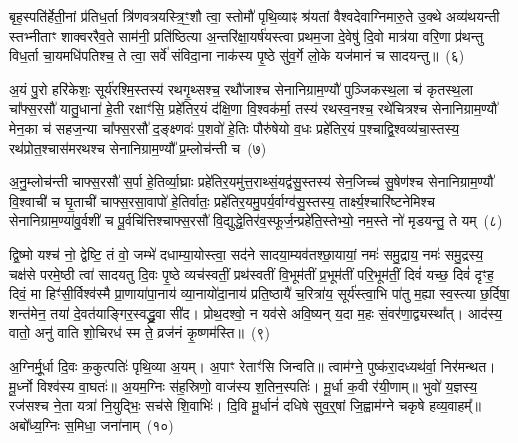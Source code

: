 बृह॒स्पति॑र्\mbox{}हेती॒नां प्र॑तिध॒र्ता त्रि॑णवत्रयस्त्रि॒ꣳ॒शौ त्वा॒ स्तोमौ॑ पृथि॒व्याꣴ श्र॑यतां वैश्वदेवाग्निमारु॒ते उ॒क्थे अव्य॑थयन्ती स्तभ्नीताꣳ शाक्वररैव॒ते साम॑नी॒ प्रति॑ष्ठित्या अ॒न्तरि॑क्षा॒यर्\mbox{}ष॑यस्त्वा प्रथम॒जा दे॒वेषु॑ दि॒वो मात्र॑या वरि॒णा प्र॑थन्तु विध॒र्ता चा॒यमधि॑पतिश्च॒ ते त्वा॒ सर्वे॑ संविदा॒ना नाक॑स्य पृ॒ष्ठे सु॑व॒र्गे लो॒के यज॑मानं च सादयन्तु॥~(६)

{\anuvakamend[{प्र॒तीची॒ दिङ्म॒रुत॑स्ते दे॒वा अधि॑पतयश्चत्वारि॒ꣳ॒शच्च॑}]}%

अ॒यं पु॒रो हरि॑केशः॒ सूर्य॑रश्मि॒स्तस्य॑ रथगृ॒थ्सश्च॒ रथौ॑जाश्च सेनानिग्राम॒ण्यौ॑ पुञ्जिकस्थ॒ला च॑ कृतस्थ॒ला चा᳚फ्स॒रसौ॑ यातु॒धाना॑ हे॒ती रक्षाꣳ॑सि॒ प्रहे॑तिर॒यं द॑क्षि॒णा वि॒श्वक॑र्मा॒ तस्य॑ रथस्व॒नश्च॒ रथे॑चित्रश्च सेनानिग्राम॒ण्यौ॑ मेन॒का च॑ सहज॒न्या चा᳚फ्स॒रसौ॑ द॒ङ्क्ष्णवः॑ प॒शवो॑ हे॒तिः पौरु॑षेयो व॒धः प्रहे॑तिर॒यं प॒श्चाद्वि॒श्वव्य॑चा॒स्तस्य॒ रथ॑प्रोत॒श्चास॑मरथश्च सेनानिग्राम॒ण्यौ᳚ प्र॒म्लोच॑न्ती च~(७)

अ॒नु॒म्लोच॑न्ती चाफ्स॒रसौ॑ स॒र्पा हे॒तिर्व्या॒घ्राः प्रहे॑तिर॒यमु॑त्त॒राथ्सं॒यद्व॑सु॒स्तस्य॑ सेन॒जिच्च॑ सु॒षेण॑श्च सेनानिग्राम॒ण्यौ॑ वि॒श्वाची॑ च घृ॒ताची॑ चाफ्स॒रसा॒वापो॑ हे॒तिर्वातः॒ प्रहे॑तिर॒यमु॒पर्य॒र्वाग्व॑सु॒स्तस्य॒ तार्क्ष्य॒श्चारि॑ष्टनेमिश्च सेनानिग्राम॒ण्या॑\-वु॒र्वशी॑ च पू॒र्वचि॑त्तिश्चाफ्स॒रसौ॑ वि॒द्युद्धे॒तिर॑व॒स्फूर्ज॒न्प्रहे॑ति॒स्तेभ्यो॒ नम॒स्ते नो॑ मृडयन्तु॒ ते यम्~(८)

द्वि॒ष्मो यश्च॑ नो॒ द्वेष्टि॒ तं वो॒ जम्भे॑ दधाम्या॒योस्त्वा॒ सद॑ने सादया॒म्यव॑तश्छा॒यायां॒ नमः॑ समु॒द्राय॒ नमः॑ समु॒द्रस्य॒ चक्ष॑से परमे॒ष्ठी त्वा॑ सादयतु दि॒वः पृ॒ष्ठे व्यच॑स्वतीं॒ प्रथ॑स्वतीं वि॒भूम॑तीं प्र॒भूम॑तीं परि॒भूम॑तीं॒ दिवं॑ यच्छ॒ दिवं॑ दृꣳह॒ दिवं॒ मा हिꣳ॑सी॒र्विश्व॑स्मै प्रा॒णाया॑पा॒नाय॑ व्या॒नायो॑दा॒नाय॑ प्रति॒ष्ठायै॑ च॒रित्रा॑य॒ सूर्य॑स्त्वा॒भि पा॑तु म॒ह्या स्व॒स्त्या छ॒र्दिषा॒ शन्त॑मेन॒ तया॑ दे॒वत॑याङ्गिर॒स्वद्ध्रु॒वा सी॑द। प्रोथ॒दश्वो॒ न यव॑से अवि॒ष्यन् य॒दा म॒हः सं॒वर॑णा॒द्व्यस्था᳚त्। आद॑स्य॒ वातो॒ अनु॑ वाति शो॒चिरध॑ स्म ते॒ व्रज॑नं कृ॒ष्णम॑स्ति॥~(९)

{\anuvakamend[{प्र॒म्लोच॑न्ती च॒ यꣴ स्व॒स्त्याष्टाविꣳ॑शतिश्च}]}%

अ॒ग्निर्मू॒र्धा दि॒वः क॒कुत्पतिः॑ पृथि॒व्या अ॒यम्। अ॒पाꣳ रेताꣳ॑सि जिन्वति॥ त्वाम॑ग्ने॒ पुष्क॑रा॒दध्यथ॑र्वा॒ निर॑मन्थत। मू॒र्ध्नो विश्व॑स्य वा॒घतः॑॥ अ॒यम॒ग्निः स॑ह॒स्रिणो॒ वाज॑स्य श॒तिन॒स्पतिः॑। मू॒र्धा क॒वी र॑यी॒णाम्॥ भुवो॑ य॒ज्ञस्य॒ रज॑सश्च ने॒ता यत्रा॑ नि॒युद्भिः॒ सच॑से शि॒वाभिः॑। दि॒वि मू॒र्धानं॑ दधिषे सुव॒र्॒\mbox{}षां जि॒ह्वाम॑ग्ने चकृषे हव्य॒वाहम्᳚॥ अबो᳚ध्य॒ग्निः स॒मिधा॒ जना॑नाम्~(१०)

